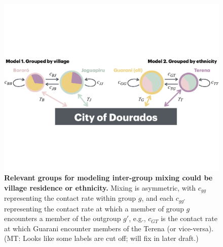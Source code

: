 \documentclass[
  letterpaper,
  abstract]{scrartcl}
\newcommand{\mt}[1]{{\textcolor{myorange} {({\tiny MT:} #1)}}}
\begin{document}
\begin{figure}[H]

\caption{
\textbf{Relevant groups for modeling inter-group mixing could be village
residence or ethnicity.} Mixing is asymmetric, with $c_{gg}$ representing the
contact rate within group $g$, and each $c_{gg'}$ representing
the contact rate at which a member of group $g$ encounters a member of the
outgroup $g'$, e.g., $c_{GT}$ is the contact rate at which Guarani encounter
members of the Terena (or vice-versa). \mt{Looks like some labels are cut off; will fix in later draft.}}
\label{fig:ModelSketch}
\vspace{0.3em}
{\centering \includegraphics{Figures/ModelSketch.pdf}

}
\end{figure}%







\end{document}
